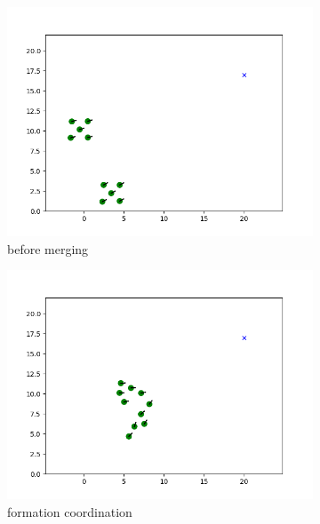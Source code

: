 \begin{figure}[htbp] 
     \centering
     \begin{subfigure}[b]{0.3\textwidth}
         \centering
         \includegraphics[width=\textwidth]{figures/merge_1.png}
         \caption{before merging}
         \label{fig:y equals x}
     \end{subfigure}
     \hfill
     \begin{subfigure}[b]{0.3\textwidth}
         \centering
         \includegraphics[width=\textwidth]{figures/merge_2.png}
         \caption{formation coordination}
         \label{fig:three sin x}
     \end{subfigure}
     \hfill
     \begin{subfigure}[b]{0.3\textwidth}

\end{subfigure}
\end{figure}
